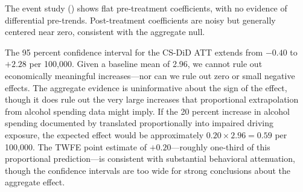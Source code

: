 \documentclass[12pt]{article}
\begin{document}
The event study () shows flat pre-treatment coefficients, with no evidence of differential pre-trends. Post-treatment coefficients are noisy but generally centered near zero, consistent with the aggregate null.

The 95 percent confidence interval for the CS-DiD ATT extends from $-0.40$ to $+2.28$ per 100,000. Given a baseline mean of 2.96, we cannot rule out economically meaningful increases---nor can we rule out zero or small negative effects. The aggregate evidence is uninformative about the sign of the effect, though it does rule out the very large increases that proportional extrapolation from alcohol spending data might imply. If the 20 percent increase in alcohol spending documented by \citet{taylor2024betting} translated proportionally into impaired driving exposure, the expected effect would be approximately $0.20 \times 2.96 = 0.59$ per 100,000. The TWFE point estimate of $+0.20$---roughly one-third of this proportional prediction---is consistent with substantial behavioral attenuation, though the confidence intervals are too wide for strong conclusions about the aggregate effect.
\end{document}
